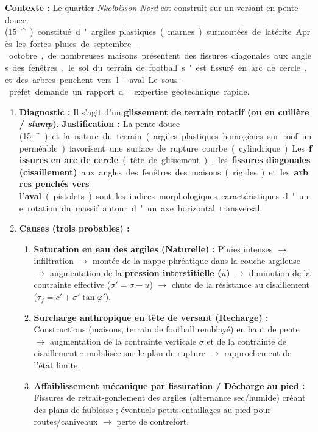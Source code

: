 \documentclass[11pt]{article}
\providecommand{\degree}{^{\circ}}
\begin{document}
\begin{exercice}
\textbf{Contexte :} Le quartier \emph{Nkolbisson-Nord} est construit sur un versant en pente douce (\SI{15}{\degree}) constitué d'argiles plastiques (marnes) surmontées de latérite. Après les fortes pluies de septembre-octobre, de nombreuses maisons présentent des fissures diagonales aux angles des fenêtres, le sol du terrain de football s'est fissuré en arc de cercle, et des arbres penchent vers l'aval. Le sous-préfet demande un rapport d'expertise géotechnique rapide.

\begin{enumerate}
\item \textbf{Diagnostic :} Il s'agit d'un \textbf{glissement de terrain rotatif (ou en cuillère / \emph{slump})}.
      \textbf{Justification :} La pente douce (\SI{15}{\degree}) et la nature du terrain (argiles plastiques homogènes sur roof imperméable) favorisent une surface de rupture courbe (cylindrique). Les \textbf{fissures en arc de cercle} (tête de glissement), les \textbf{fissures diagonales (cisaillement)} aux angles des fenêtres des maisons (rigides) et les \textbf{arbres penchés vers l'aval} (pistolets) sont les indices morphologiques caractéristiques d'une rotation du massif autour d'un axe horizontal transversal.
\item \textbf{Causes (trois probables) :}
      \begin{enumerate}
      \item \textbf{Saturation en eau des argiles (Naturelle) :} Pluies intenses $\rightarrow$ infiltration $\rightarrow$ montée de la nappe phréatique dans la couche argileuse $\rightarrow$ augmentation de la \textbf{pression interstitielle ($u$)} $\rightarrow$ diminution de la contrainte effective ($\sigma' = \sigma - u$) $\rightarrow$ chute de la résistance au cisaillement ($\tau_f = c' + \sigma' \tan\varphi'$).
      \item \textbf{Surcharge anthropique en tête de versant (Recharge) :} Constructions (maisons, terrain de football remblayé) en haut de pente $\rightarrow$ augmentation de la contrainte verticale $\sigma$ et de la contrainte de cisaillement $\tau$ mobilisée sur le plan de rupture $\rightarrow$ rapprochement de l'état limite.
      \item \textbf{Affaiblissement mécanique par fissuration / Décharge au pied :} Fissures de retrait-gonflement des argiles (alternance sec/humide) créant des plans de faiblesse ; éventuels petits entaillages au pied pour routes/caniveaux $\rightarrow$ perte de contrefort.

\end{enumerate}
\end{enumerate}
\end{exercice}
\end{document}

